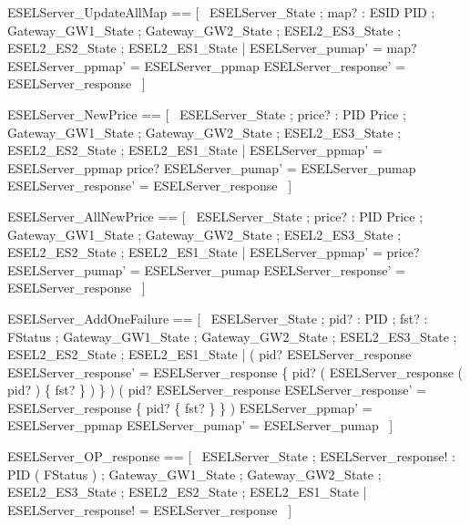 \documentclass{article}
\begin{document}
\begin{zed}
	ESELServer\_UpdateAllMap == [~  \Delta ESELServer\_State ; map? : ESID \pfun PID ; \Xi Gateway\_GW1\_State ; \Xi Gateway\_GW2\_State ; \Xi ESEL2\_ES3\_State ; \Xi ESEL2\_ES2\_State ; \Xi ESEL2\_ES1\_State | ESELServer\_pumap' = map? \land ESELServer\_ppmap' = ESELServer\_ppmap \land ESELServer\_response' = ESELServer\_response  ~]
\end{zed}

\begin{zed}
	ESELServer\_NewPrice == [~  \Delta ESELServer\_State ; price? : PID \pfun Price ; \Xi Gateway\_GW1\_State ; \Xi Gateway\_GW2\_State ; \Xi ESEL2\_ES3\_State ; \Xi ESEL2\_ES2\_State ; \Xi ESEL2\_ES1\_State | ESELServer\_ppmap' = ESELServer\_ppmap \oplus price? \land ESELServer\_pumap' = ESELServer\_pumap \land ESELServer\_response' = ESELServer\_response  ~]
\end{zed}

\begin{zed}
	ESELServer\_AllNewPrice == [~  \Delta ESELServer\_State ; price? : PID \pfun Price ; \Xi Gateway\_GW1\_State ; \Xi Gateway\_GW2\_State ; \Xi ESEL2\_ES3\_State ; \Xi ESEL2\_ES2\_State ; \Xi ESEL2\_ES1\_State | ESELServer\_ppmap' = price? \land ESELServer\_pumap' = ESELServer\_pumap \land ESELServer\_response' = ESELServer\_response  ~]
\end{zed}

\begin{zed}
	ESELServer\_AddOneFailure == [~  \Delta ESELServer\_State ; pid? : PID ; fst? : FStatus ; \Xi Gateway\_GW1\_State ; \Xi Gateway\_GW2\_State ; \Xi ESEL2\_ES3\_State ; \Xi ESEL2\_ES2\_State ; \Xi ESEL2\_ES1\_State | ( pid? \in \dom ESELServer\_response \implies ESELServer\_response' = ESELServer\_response \oplus \{ pid? \mapsto ( ESELServer\_response ( pid? ) \cup \{ fst? \} ) \} ) \land ( pid? \notin \dom ESELServer\_response \implies ESELServer\_response' = ESELServer\_response \cup \{ pid? \mapsto \{ fst? \} \} ) \land ESELServer\_ppmap' = ESELServer\_ppmap \land ESELServer\_pumap' = ESELServer\_pumap  ~]
\end{zed}

\begin{zed}
	ESELServer\_OP\_response == [~  \Xi ESELServer\_State ; ESELServer\_response! : PID \pfun ( \power FStatus ) ; \Xi Gateway\_GW1\_State ; \Xi Gateway\_GW2\_State ; \Xi ESEL2\_ES3\_State ; \Xi ESEL2\_ES2\_State ; \Xi ESEL2\_ES1\_State | ESELServer\_response! = ESELServer\_response  ~]
\end{zed}
\end{document}
